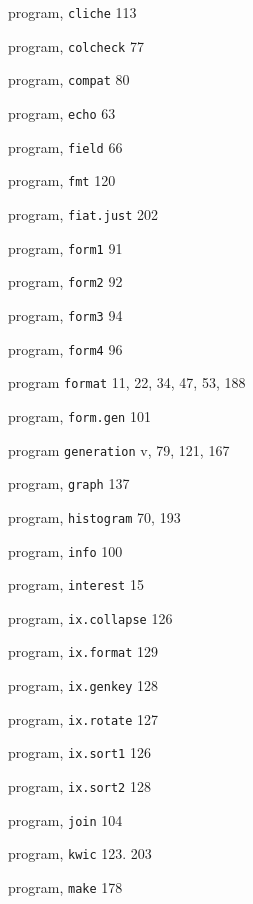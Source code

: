 \begin{multicols}{3}
\hangindent=3pc  program, \verb'cliche' 113

\hangindent=3pc  program, \verb'colcheck' 77

\hangindent=3pc  program, \verb'compat' 80

\hangindent=3pc  program, \verb'echo' 63

\hangindent=3pc  program, \verb'field' 66

\hangindent=3pc  program, \verb'fmt' 120

\hangindent=3pc  program, \verb'fiat.just' 202

\hangindent=3pc  program, \verb'form1' 91

\hangindent=3pc  program, \verb'form2' 92

\hangindent=3pc  program, \verb'form3' 94

\hangindent=3pc  program, \verb'form4' 96

\hangindent=3pc  program \verb'format' 11, 22, 34, 47, 53, 188

\hangindent=3pc  program, \verb'form.gen' 101

\hangindent=3pc  program \verb'generation' v, 79, 121, 167

\hangindent=3pc  program, \verb'graph' 137

\hangindent=3pc  program, \verb'histogram' 70, 193

\hangindent=3pc  program, \verb'info' 100

\hangindent=3pc  program, \verb'interest' 15

\hangindent=3pc  program, \verb'ix.collapse' 126

\hangindent=3pc  program, \verb'ix.format' 129

\hangindent=3pc  program, \verb'ix.genkey' 128

\hangindent=3pc  program, \verb'ix.rotate' 127

\hangindent=3pc  program, \verb'ix.sort1' 126

\hangindent=3pc  program, \verb'ix.sort2' 128

\hangindent=3pc  program, \verb'join' 104

\hangindent=3pc  program, \verb'kwic' 123. 203

\hangindent=3pc  program, \verb'make' 178


\end{multicols}
